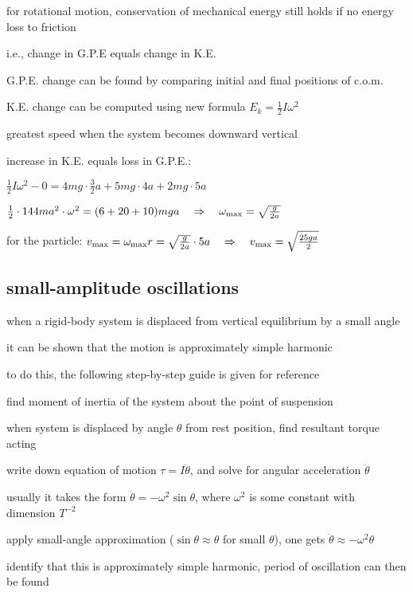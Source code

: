 for rotational motion, conservation of mechanical energy still holds if no energy loss to friction

i.e., change in G.P.E equals change in K.E.

G.P.E. change can be found by comparing initial and final positions of c.o.m.

K.E. change can be computed using new formula $E_k = \frac{1}{2} I \omega^2$


greatest speed when the system becomes downward vertical

increase in K.E. equals loss in G.P.E.: 

{
\centering

$\frac{1}{2}I\omega^2 - 0 = 4mg\cdot \frac{3}{2}a + 5mg\cdot4a+2mg\cdot5a$

$\frac{1}{2}\cdot 144ma^2 \cdot \omega^2 = (6+20+10)mga \quad \Rightarrow \quad \omega_{\text{max}} = \sqrt{\frac{g}{2a}}$

}

for the particle: $v_{\text{max}} = \omega_{\text{max}} r = \sqrt{\frac{g}{2a}} \cdot 5a \quad \Rightarrow \quad  v_{\text{max}} = \sqrt{\frac{25ga}{2}}$ \eoe

\subsection{small-amplitude oscillations}

when a rigid-body system is displaced from vertical equilibrium by a small angle

it can be shown that the motion is approximately simple harmonic

to do this, the following step-by-step guide is given for reference

\begin{compactenum}
	\item find moment of inertia of the system about the point of suspension
	
	\item when system is displaced by angle $\theta$ from rest position, find resultant torque acting
	
	\item write down equation of motion $\tau = I \ddot{\theta}$, and solve for angular acceleration $\ddot{\theta}$
	
	usually it takes the form $\ddot{\theta} = - \omega^2 \sin\theta$, where $\omega^2$ is some constant with dimension $T^{-2}$
	
	\item apply small-angle approximation ($\sin\theta \approx \theta$ for small $\theta$), one gets $\ddot{\theta} \approx - \omega^2 \theta$
	
	\item identify that this is approximately simple harmonic, period of oscillation can then be found
\end{compactenum}



